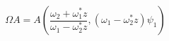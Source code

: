 \begin{equation}
\Omega A= A(\frac{\omega_2 + \omega_1^* z}{\omega_1 - \omega_2^* z} , (\omega_1 -\omega_2^* z)\psi_1)
\end{equation}

